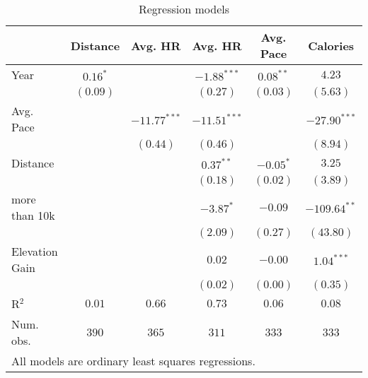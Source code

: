 
\begin{table}
\caption{Regression models}
\begin{center}
\begin{tabular}{l c c c c c}
\hline
 & Distance & Avg. HR & Avg. HR & Avg. Pace & Calories \\
\hline
Year           & $0.16^{*}$ &                & $-1.88^{***}$  & $0.08^{**}$ & $4.23$         \\
               & $(0.09)$   &                & $(0.27)$       & $(0.03)$    & $(5.63)$       \\
Avg. Pace      &            & $-11.77^{***}$ & $-11.51^{***}$ &             & $-27.90^{***}$ \\
               &            & $(0.44)$       & $(0.46)$       &             & $(8.94)$       \\
Distance       &            &                & $0.37^{**}$    & $-0.05^{*}$ & $3.25$         \\
               &            &                & $(0.18)$       & $(0.02)$    & $(3.89)$       \\
more than 10k  &            &                & $-3.87^{*}$    & $-0.09$     & $-109.64^{**}$ \\
               &            &                & $(2.09)$       & $(0.27)$    & $(43.80)$      \\
Elevation Gain &            &                & $0.02$         & $-0.00$     & $1.04^{***}$   \\
               &            &                & $(0.02)$       & $(0.00)$    & $(0.35)$       \\
\hline
R$^2$          & $0.01$     & $0.66$         & $0.73$         & $0.06$      & $0.08$         \\
Num. obs.      & $390$      & $365$          & $311$          & $333$       & $333$          \\
\hline
\multicolumn{6}{l}{\scriptsize{All models are ordinary least squares regressions.}}
\end{tabular}
\label{table:coefficients}
\end{center}
\end{table}
